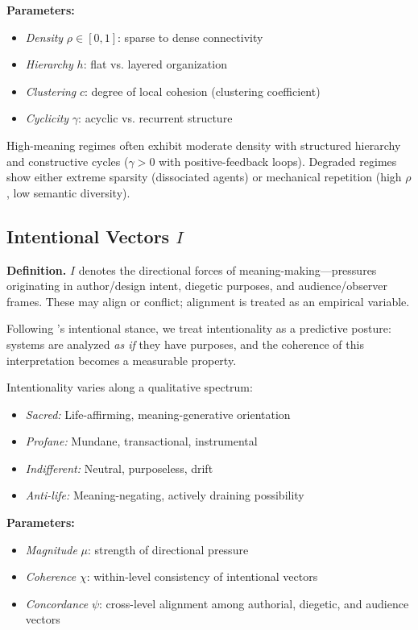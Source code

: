 \documentclass[12pt]{article}
\begin{document}
\textbf{Parameters:}
\begin{itemize}
\item \textit{Density} $\rho \in [0,1]$: sparse to dense connectivity
\item \textit{Hierarchy} $h$: flat vs. layered organization
\item \textit{Clustering} $c$: degree of local cohesion (clustering coefficient)
\item \textit{Cyclicity} $\gamma$: acyclic vs. recurrent structure
\end{itemize}

High-meaning regimes often exhibit moderate density with structured hierarchy and constructive cycles ($\gamma > 0$ with positive-feedback loops). Degraded regimes show either extreme sparsity (dissociated agents) or mechanical repetition (high $\rho$, low semantic diversity).

\subsection{Intentional Vectors $I$}

\textbf{Definition.} $I$ denotes the directional forces of meaning-making—pressures originating in author/design intent, diegetic purposes, and audience/observer frames. These may align or conflict; alignment is treated as an empirical variable.

Following \citet{dennett1987intentional}'s intentional stance, we treat intentionality as a predictive posture: systems are analyzed \textit{as if} they have purposes, and the coherence of this interpretation becomes a measurable property.

Intentionality varies along a qualitative spectrum:
\begin{itemize}
\item \textit{Sacred:} Life-affirming, meaning-generative orientation
\item \textit{Profane:} Mundane, transactional, instrumental
\item \textit{Indifferent:} Neutral, purposeless, drift
\item \textit{Anti-life:} Meaning-negating, actively draining possibility
\end{itemize}

\textbf{Parameters:}
\begin{itemize}
\item \textit{Magnitude} $\mu$: strength of directional pressure
\item \textit{Coherence} $\chi$: within-level consistency of intentional vectors
\item \textit{Concordance} $\psi$: cross-level alignment among authorial, diegetic, and audience vectors
\end{itemize}
\end{document}
